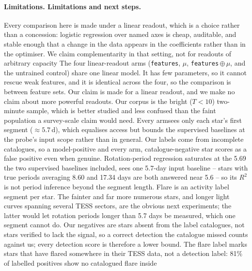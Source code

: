 \documentclass{article}
\providecommand{\DIFaddtex}[1]{{\protect\color{blue} \sf #1}} %
\providecommand{\DIFdeltex}[1]{{\protect\color{red} \scriptsize #1}} %
\providecommand{\DIFaddbegin}{} %
\providecommand{\DIFaddend}{} %
\providecommand{\DIFdelbegin}{} %
\providecommand{\DIFdelend}{} %
\providecommand{\DIFadd}[1]{\texorpdfstring{\DIFaddtex{#1}}{#1}} %
\providecommand{\DIFdel}[1]{\texorpdfstring{\DIFdeltex{#1}}{}} %
\providecommand{\DIFscaledelfig}{0.5}
\newlength{\DIFdelgraphicswidth} %
\newlength{\DIFdelgraphicsheight} %
\providecommand{\DIFaddincludegraphics}[2][]{{\color{blue}\fbox{\DIFOincludegraphics[#1]{#2}}}} %
\providecommand{\DIFdelincludegraphics}[2][]{%
\sbox{\DIFdelgraphicsbox}{\DIFOincludegraphics[#1]{#2}}%
\settoboxwidth{\DIFdelgraphicswidth}{\DIFdelgraphicsbox} %
\settoboxtotalheight{\DIFdelgraphicsheight}{\DIFdelgraphicsbox} %
\scalebox{\DIFscaledelfig}{%
\parbox[b]{\DIFdelgraphicswidth}{\usebox{\DIFdelgraphicsbox}\\[-\baselineskip] \rule{\DIFdelgraphicswidth}{0em}}\llap{\resizebox{\DIFdelgraphicswidth}{\DIFdelgraphicsheight}{%
\setlength{\unitlength}{\DIFdelgraphicswidth}%
\begin{picture}(1,1)%
\thicklines\linethickness{2pt} %
{\color[rgb]{1,0,0}\put(0,0){\framebox(1,1){}}}%
{\color[rgb]{1,0,0}\put(0,0){\line( 1,1){1}}}%
{\color[rgb]{1,0,0}\put(0,1){\line(1,-1){1}}}%
\end{picture}%
}\hspace*{3pt}}} %
} %
\DeclareRobustCommand{\DIFaddbegin}{\DIFOaddbegin \let\includegraphics\DIFaddincludegraphics} %
\DeclareRobustCommand{\DIFaddend}{\DIFOaddend \let\includegraphics\DIFOincludegraphics} %
\DeclareRobustCommand{\DIFdelbegin}{\DIFOdelbegin \let\includegraphics\DIFdelincludegraphics} %
\DeclareRobustCommand{\DIFdelend}{\DIFOaddend \let\includegraphics\DIFOincludegraphics} %
\begin{document}
\paragraph{\DIFdelbegin \DIFdel{\textbf{Limitations.}}\DIFdelend \DIFaddbegin \DIFadd{\textbf{Limitations and next steps.}}\DIFaddend } \DIFdelbegin \DIFdel{Every comparison here is made under a linear readout,
which is a
choice rather than a concession: logistic regression over named axes is cheap, auditable, and stable
enough that a change in the data appears in the coefficients rather than in the optimiser. We claim complementarity in that setting, not for readouts of arbitrary capacity}\DIFdelend \DIFaddbegin \DIFadd{The four linear-readout arms (\texttt{features},
$\mu$, \texttt{features}\,$\oplus\,\mu$, and the untrained control) share one linear model. It has few
parameters, so it cannot rescue weak features, and it is identical across the four, so the comparison
is between feature sets. Our claim is made for a linear readout, and we make no claim about more
powerful readouts}\DIFaddend . Our corpus is the bright ($T < 10$) two-minute sample, \DIFdelbegin \DIFdel{which is
better studied and less confused than the faint population a survey-scale claim would need. Every armsees only each star's first segment ($\approx 5.7$\,d), which equalises access but bounds the supervised baselines at the probe's input scope rather than in general. Our
labels come from incomplete catalogues, so a
model-positive}\DIFdelend \DIFaddbegin \DIFadd{and every arm}\DIFaddend , \DIFdelbegin \DIFdel{catalogue-negative star scores as a false positive even when genuine. Rotation-period regression saturates at the 5.69}\DIFdelend \DIFaddbegin \DIFadd{the two
supervised baselines included, sees one 5.7}\DIFaddend -day \DIFdelbegin \DIFdel{input
baseline -- stars with true periods averaging 8.60 and 17.34 days are both answered near 5.6 -- so its
$R^{2}$ is not period inference beyond the segment length. Flare is an activity label }\DIFdelend \DIFaddbegin \DIFadd{segment per star. The fainter and far more numerous
stars, and longer light curves spanning several TESS sectors, are the obvious next experiments; the
latter would let rotation periods longer than 5.7 days be measured, which one segment cannot do. Our
negatives are stars absent from the label catalogues, not stars verified to lack the signal, so a
correct detection the catalogue missed counts against us; every detection score is therefore a lower
bound. The flare label marks stars that have flared somewhere in their TESS data}\DIFaddend , not a \DIFdelbegin \DIFdel{detection
label: 81\% of labelled positives show no catalogued }\DIFdelend flare inside
\end{document}
